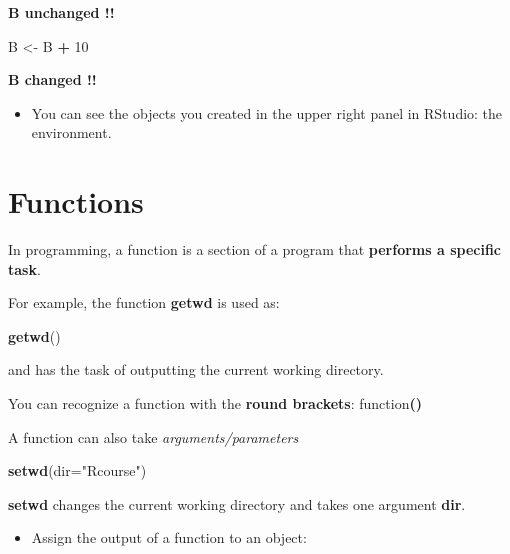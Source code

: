 \documentclass[]{book}
\newenvironment{Shaded}{\begin{snugshade}}{\end{snugshade}}
\newcommand{\DataTypeTok}[1]{\textcolor[rgb]{0.13,0.29,0.53}{#1}}
\newcommand{\DecValTok}[1]{\textcolor[rgb]{0.00,0.00,0.81}{#1}}
\newcommand{\KeywordTok}[1]{\textcolor[rgb]{0.13,0.29,0.53}{\textbf{#1}}}
\newcommand{\NormalTok}[1]{#1}
\newcommand{\OperatorTok}[1]{\textcolor[rgb]{0.81,0.36,0.00}{\textbf{#1}}}
\newcommand{\StringTok}[1]{\textcolor[rgb]{0.31,0.60,0.02}{#1}}
\providecommand{\tightlist}{%
  \setlength{\itemsep}{0pt}\setlength{\parskip}{0pt}}
\begin{document}
{\textbf{B unchanged !!}}

\begin{Shaded}
\begin{Highlighting}[]
\NormalTok{B <-}\StringTok{ }\NormalTok{B }\OperatorTok{+}\StringTok{ }\DecValTok{10}
\end{Highlighting}
\end{Shaded}

{\textbf{B changed !!}}

\begin{itemize}
\tightlist
\item
  You can see the objects you created in the upper right panel in RStudio: the environment.
\end{itemize}

\hypertarget{functions}{%
\chapter{Functions}\label{functions}}

In programming, a function is a section of a program that \textbf{performs a specific task}.

For example, the function \textbf{getwd} is used as:

\begin{Shaded}
\begin{Highlighting}[]
\KeywordTok{getwd}\NormalTok{()}
\end{Highlighting}
\end{Shaded}

and has the task of outputting the current working directory.

You can recognize a function with the \textbf{round brackets}: function\textbf{()}

A function can also take \emph{arguments/parameters}

\begin{Shaded}
\begin{Highlighting}[]
\KeywordTok{setwd}\NormalTok{(}\DataTypeTok{dir=}\StringTok{"Rcourse"}\NormalTok{)}
\end{Highlighting}
\end{Shaded}

\textbf{setwd} changes the current working directory and takes one argument \textbf{dir}.

\begin{itemize}
\tightlist
\item
  Assign the output of a function to an object:
\end{itemize}
\end{document}

